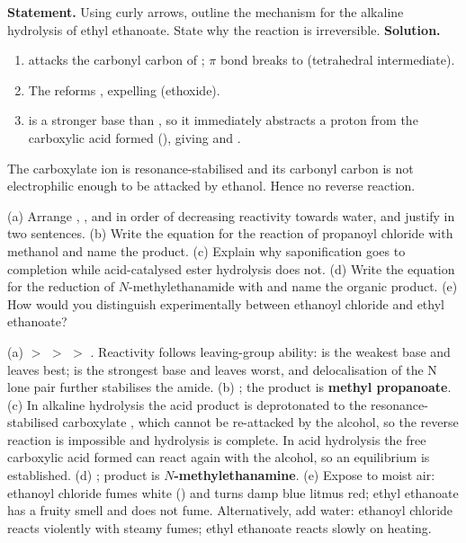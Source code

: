 \documentclass[11pt]{article}
\begin{document}
\begin{exoresolu}
\textbf{Statement.} Using curly arrows, outline the mechanism for the alkaline hydrolysis of ethyl ethanoate. State why the reaction is irreversible.
\tcblower
\textbf{Solution.}
\begin{enumerate}
\item {} attacks the carbonyl carbon of ;  $\pi$ bond breaks to  (tetrahedral intermediate).
\item The  reforms , expelling  (ethoxide).
\item {} is a stronger base than , so it immediately abstracts a proton from the carboxylic acid formed (), giving  and .
\end{enumerate}
The carboxylate ion  is resonance-stabilised and its carbonyl carbon is not electrophilic enough to be attacked by ethanol. Hence no reverse reaction.
\end{exoresolu}

\begin{exercice}
(a) Arrange , ,  and  in order of decreasing reactivity towards water, and justify in two sentences. (b) Write the equation for the reaction of propanoyl chloride with methanol and name the product. (c) Explain why saponification goes to completion while acid-catalysed ester hydrolysis does not. (d) Write the equation for the reduction of $N$-methylethanamide with  and name the organic product. (e) How would you distinguish experimentally between ethanoyl chloride and ethyl ethanoate?
\end{exercice}

\begin{corrige}[Exercise 1]
(a)  $>$  $>$  $>$ . Reactivity follows leaving-group ability:  is the weakest base and leaves best;  is the strongest base and leaves worst, and delocalisation of the N lone pair further stabilises the amide. (b) ; the product is \textbf{methyl propanoate}. (c) In alkaline hydrolysis the acid product is deprotonated to the resonance-stabilised carboxylate , which cannot be re-attacked by the alcohol, so the reverse reaction is impossible and hydrolysis is complete. In acid hydrolysis the free carboxylic acid formed can react again with the alcohol, so an equilibrium is established. (d) ; product is \textbf{$N$-methylethanamine}. (e) Expose to moist air: ethanoyl chloride fumes white () and turns damp blue litmus red; ethyl ethanoate has a fruity smell and does not fume. Alternatively, add water: ethanoyl chloride reacts violently with steamy fumes; ethyl ethanoate reacts slowly on heating.
\end{corrige}
\end{document}
